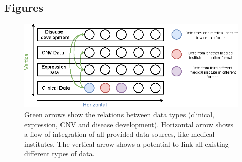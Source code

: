 \documentclass{bmcart}
\begin{document}
\begin{backmatter}




\section*{Figures}


\begin{figure}[h!]
  \centering
  \includegraphics{Fig1.eps}
  \caption{
     Green arrows show the
relations between data types (clinical, expression, CNV and disease
development). Horizontal arrow shows a flow of integration of all
provided data sources, like medical institutes. The vertical arrow
shows a potential to link all existing different types of data.
  }
  \label{figure_1}
\end{figure}



\end{backmatter}
\end{document}
